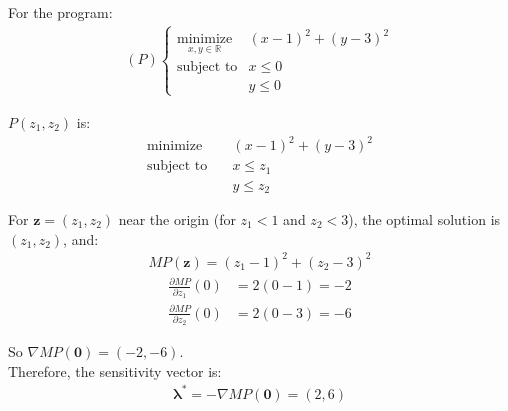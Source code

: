\documentclass{article}
\begin{document}
For the program:
\begin{align*}
(P) \begin{cases}
\underset{x,y\in\mathbb{R}}{\text{minimize}} & (x - 1)^2 + (y - 3)^2 \\
\text{subject to} & x \leq 0 \\
& y \leq 0
\end{cases}
\end{align*}

$P(z_1, z_2)$ is:
\begin{align*}
\text{minimize} \quad & (x - 1)^2 + (y - 3)^2 \\
\text{subject to} \quad & x \leq z_1 \\
& y \leq z_2
\end{align*}

For $\mathbf{z} = (z_1, z_2)$ near the origin (for $z_1 < 1$ and $z_2 < 3$), the optimal solution is $(z_1, z_2)$, and:
\begin{align*}
MP(\mathbf{z}) = (z_1 - 1)^2 + (z_2 - 3)^2
\end{align*}
\begin{align*}
\frac{\partial MP}{\partial z_1}(0) &= 2(0 - 1) = -2 \\
\frac{\partial MP}{\partial z_2}(0) &= 2(0 - 3) = -6
\end{align*}

So $\nabla MP(\mathbf{0}) = (-2, -6)$. \\

Therefore, the sensitivity vector is:
\begin{align*}
\boldsymbol{\lambda}^* = -\nabla MP(\mathbf{0}) = (2, 6)
\end{align*}
\end{document}
